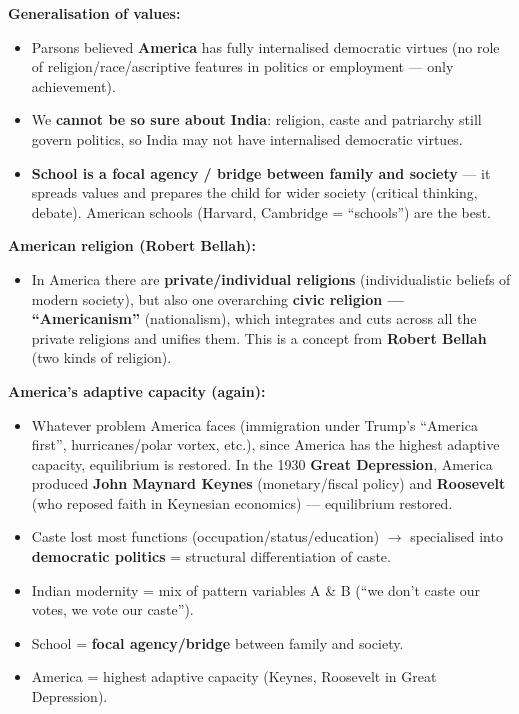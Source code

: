 \begin{CriticalPoint}
\textbf{Generalisation of values:}
\begin{itemize}
\item Parsons believed \textbf{America} has fully internalised democratic virtues (no role of religion/race/ascriptive features in politics or employment --- only achievement).
\item We \textbf{cannot be so sure about India}: religion, caste and patriarchy still govern politics, so India may not have internalised democratic virtues.
\item \textbf{School is a focal agency / bridge between family and society} --- it spreads values and prepares the child for wider society (critical thinking, debate). American schools (Harvard, Cambridge = ``schools'') are the best.
\end{itemize}
\end{CriticalPoint}

\begin{DataFact}
\textbf{American religion (Robert Bellah):}
\begin{itemize}
\item In America there are \textbf{private/individual religions} (individualistic beliefs of modern society), but also one overarching \textbf{civic religion --- ``Americanism''} (nationalism), which integrates and cuts across all the private religions and unifies them. This is a concept from \textbf{Robert Bellah} (two kinds of religion).
\end{itemize}
\end{DataFact}

\begin{ExampleBox}
\textbf{America's adaptive capacity (again):}
\begin{itemize}
\item Whatever problem America faces (immigration under Trump's ``America first'', hurricanes/polar vortex, etc.), since America has the highest adaptive capacity, equilibrium is restored. In the 1930 \textbf{Great Depression}, America produced \textbf{John Maynard Keynes} (monetary/fiscal policy) and \textbf{Roosevelt} (who reposed faith in Keynesian economics) --- equilibrium restored.
\end{itemize}
\end{ExampleBox}

\begin{QuickRevision}
\begin{itemize}
\item Caste lost most functions (occupation/status/education) $\rightarrow$ specialised into \textbf{democratic politics} = structural differentiation of caste.
\item Indian modernity = mix of pattern variables A \& B (``we don't caste our votes, we vote our caste'').
\item School = \textbf{focal agency/bridge} between family and society.
\item America = highest adaptive capacity (Keynes, Roosevelt in Great Depression).
\end{itemize}
\end{QuickRevision}

